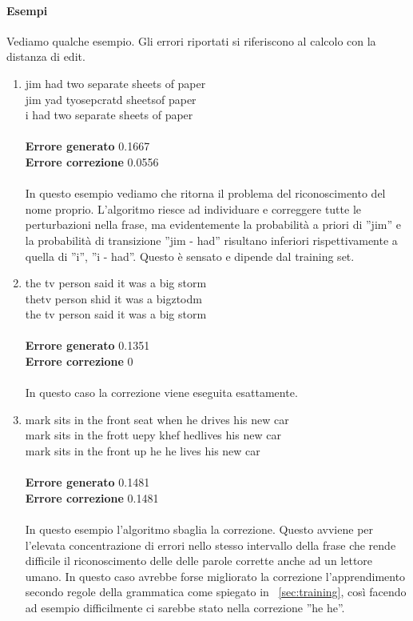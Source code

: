 \paragraph*{Esempi}
Vediamo qualche esempio. Gli errori riportati si riferiscono al calcolo con la distanza di edit.
\begin{enumerate}
\item jim had two separate sheets of paper\\
      jim yad tyosepcratd sheetsof paper\\
      i had two separate sheets of paper\\
\\
\textbf{Errore generato} 0.1667\\
\textbf{Errore correzione} 0.0556\\
\\
In questo esempio vediamo che ritorna il problema del riconoscimento del nome proprio. L'algoritmo riesce ad individuare e correggere tutte le perturbazioni nella frase, ma evidentemente la probabilità a priori di ''jim'' e la probabilità di transizione ''jim - had'' risultano inferiori rispettivamente a quella di ''i'', ''i - had''. Questo è sensato e dipende dal training set.
\item the tv person said it was a big storm\\
thetv person shid it was a bigztodm\\
the tv person said it was a big storm\\
\\
\textbf{Errore generato} 0.1351\\
\textbf{Errore correzione} 0\\
\\
In questo caso la correzione viene eseguita esattamente.
\item mark sits in the front seat when he drives his new car\\
mark sits in the frott uepy khef hedlives his new car\\
mark sits in the front up he he lives his new car\\
\\
\textbf{Errore generato} 0.1481\\
\textbf{Errore correzione} 0.1481\\
\\
In questo esempio l'algoritmo sbaglia la correzione. Questo avviene per l'elevata concentrazione di errori nello stesso intervallo della frase che rende difficile il riconoscimento delle delle parole corrette anche ad un lettore umano. In questo caso avrebbe forse migliorato la correzione l'apprendimento secondo regole della grammatica come spiegato in  ~\ref{sec:training}, così facendo ad esempio difficilmente ci sarebbe stato nella correzione ''he he''.

\end{enumerate}

